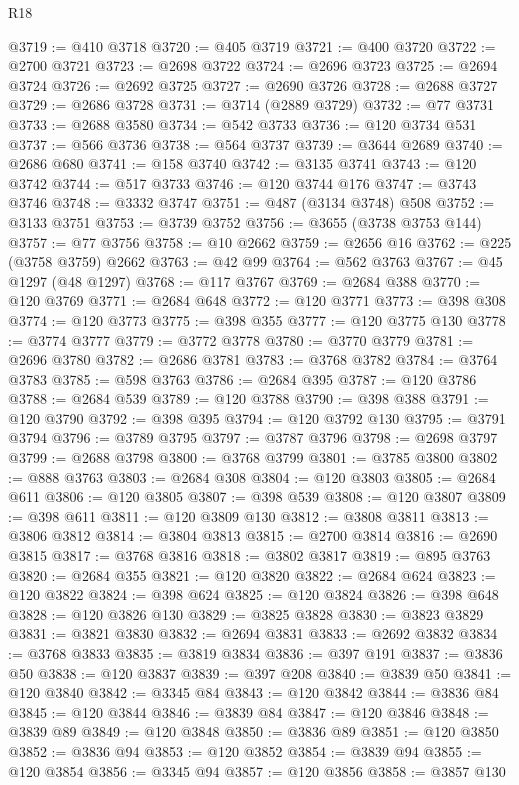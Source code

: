 \begin{lexlean}{R18}
\begin{coremodule}
@3719 := @410 @3718
@3720 := @405 @3719
@3721 := @400 @3720
@3722 := @2700 @3721
@3723 := @2698 @3722
@3724 := @2696 @3723
@3725 := @2694 @3724
@3726 := @2692 @3725
@3727 := @2690 @3726
@3728 := @2688 @3727
@3729 := @2686 @3728
@3731 := @3714 (@2889 @3729)
@3732 := @77 @3731
@3733 := @2688 @3580
@3734 := @542 @3733
@3736 := @120 @3734 @531
@3737 := @566 @3736
@3738 := @564 @3737
@3739 := @3644 @2689
@3740 := @2686 @680
@3741 := @158 @3740
@3742 := @3135 @3741
@3743 := @120 @3742
@3744 := @517 @3733
@3746 := @120 @3744 @176
@3747 := @3743 @3746
@3748 := @3332 @3747
@3751 := @487 (@3134 @3748) @508
@3752 := @3133 @3751
@3753 := @3739 @3752
@3756 := @3655 (@3738 @3753 @144)
@3757 := @77 @3756
@3758 := @10 @2662
@3759 := @2656 @16
@3762 := @225 (@3758 @3759) @2662
@3763 := @42 @99
@3764 := @562 @3763
@3767 := @45 @1297 (@48 @1297)
@3768 := @117 @3767
@3769 := @2684 @388
@3770 := @120 @3769
@3771 := @2684 @648
@3772 := @120 @3771
@3773 := @398 @308
@3774 := @120 @3773
@3775 := @398 @355
@3777 := @120 @3775 @130
@3778 := @3774 @3777
@3779 := @3772 @3778
@3780 := @3770 @3779
@3781 := @2696 @3780
@3782 := @2686 @3781
@3783 := @3768 @3782
@3784 := @3764 @3783
@3785 := @598 @3763
@3786 := @2684 @395
@3787 := @120 @3786
@3788 := @2684 @539
@3789 := @120 @3788
@3790 := @398 @388
@3791 := @120 @3790
@3792 := @398 @395
@3794 := @120 @3792 @130
@3795 := @3791 @3794
@3796 := @3789 @3795
@3797 := @3787 @3796
@3798 := @2698 @3797
@3799 := @2688 @3798
@3800 := @3768 @3799
@3801 := @3785 @3800
@3802 := @888 @3763
@3803 := @2684 @308
@3804 := @120 @3803
@3805 := @2684 @611
@3806 := @120 @3805
@3807 := @398 @539
@3808 := @120 @3807
@3809 := @398 @611
@3811 := @120 @3809 @130
@3812 := @3808 @3811
@3813 := @3806 @3812
@3814 := @3804 @3813
@3815 := @2700 @3814
@3816 := @2690 @3815
@3817 := @3768 @3816
@3818 := @3802 @3817
@3819 := @895 @3763
@3820 := @2684 @355
@3821 := @120 @3820
@3822 := @2684 @624
@3823 := @120 @3822
@3824 := @398 @624
@3825 := @120 @3824
@3826 := @398 @648
@3828 := @120 @3826 @130
@3829 := @3825 @3828
@3830 := @3823 @3829
@3831 := @3821 @3830
@3832 := @2694 @3831
@3833 := @2692 @3832
@3834 := @3768 @3833
@3835 := @3819 @3834
@3836 := @397 @191
@3837 := @3836 @50
@3838 := @120 @3837
@3839 := @397 @208
@3840 := @3839 @50
@3841 := @120 @3840
@3842 := @3345 @84
@3843 := @120 @3842
@3844 := @3836 @84
@3845 := @120 @3844
@3846 := @3839 @84
@3847 := @120 @3846
@3848 := @3839 @89
@3849 := @120 @3848
@3850 := @3836 @89
@3851 := @120 @3850
@3852 := @3836 @94
@3853 := @120 @3852
@3854 := @3839 @94
@3855 := @120 @3854
@3856 := @3345 @94
@3857 := @120 @3856
@3858 := @3857 @130

\end{coremodule}
\end{lexlean}

